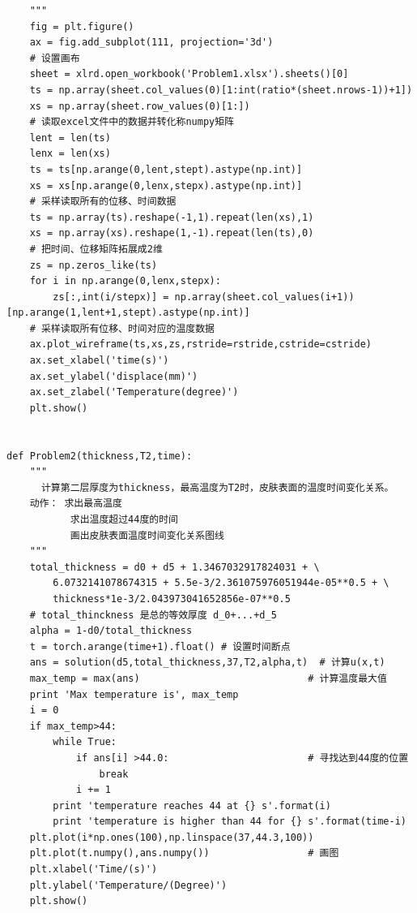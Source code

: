 \documentclass[bwprint]{cumcmthesis}
\begin{document}
\begin{verbatim}
    """
    fig = plt.figure()
    ax = fig.add_subplot(111, projection='3d')
    # 设置画布
    sheet = xlrd.open_workbook('Problem1.xlsx').sheets()[0]
    ts = np.array(sheet.col_values(0)[1:int(ratio*(sheet.nrows-1))+1])
    xs = np.array(sheet.row_values(0)[1:])
    # 读取excel文件中的数据并转化称numpy矩阵
    lent = len(ts)
    lenx = len(xs)
    ts = ts[np.arange(0,lent,stept).astype(np.int)]
    xs = xs[np.arange(0,lenx,stepx).astype(np.int)]
    # 采样读取所有的位移、时间数据
    ts = np.array(ts).reshape(-1,1).repeat(len(xs),1)
    xs = np.array(xs).reshape(1,-1).repeat(len(ts),0)
    # 把时间、位移矩阵拓展成2维
    zs = np.zeros_like(ts)
    for i in np.arange(0,lenx,stepx):
        zs[:,int(i/stepx)] = np.array(sheet.col_values(i+1))[np.arange(1,lent+1,stept).astype(np.int)]
    # 采样读取所有位移、时间对应的温度数据
    ax.plot_wireframe(ts,xs,zs,rstride=rstride,cstride=cstride)
    ax.set_xlabel('time(s)')
    ax.set_ylabel('displace(mm)')
    ax.set_zlabel('Temperature(degree)')
    plt.show()


def Problem2(thickness,T2,time):        
    """
      计算第二层厚度为thickness，最高温度为T2时，皮肤表面的温度时间变化关系。
    动作： 求出最高温度
           求出温度超过44度的时间
           画出皮肤表面温度时间变化关系图线
    """
    total_thickness = d0 + d5 + 1.3467032917824031 + \
        6.0732141078674315 + 5.5e-3/2.361075976051944e-05**0.5 + \ 
        thickness*1e-3/2.043973041652856e-07**0.5
    # total_thinckness 是总的等效厚度 d_0+...+d_5
    alpha = 1-d0/total_thickness
    t = torch.arange(time+1).float() # 设置时间断点
    ans = solution(d5,total_thickness,37,T2,alpha,t)  # 计算u(x,t)
    max_temp = max(ans)                             # 计算温度最大值
    print 'Max temperature is', max_temp            
    i = 0
    if max_temp>44:
        while True:
            if ans[i] >44.0:                        # 寻找达到44度的位置
                break
            i += 1
        print 'temperature reaches 44 at {} s'.format(i)
        print 'temperature is higher than 44 for {} s'.format(time-i)
    plt.plot(i*np.ones(100),np.linspace(37,44.3,100))
    plt.plot(t.numpy(),ans.numpy())                 # 画图
    plt.xlabel('Time/(s)')
    plt.ylabel('Temperature/(Degree)')
    plt.show()

\end{verbatim}
\end{document}
